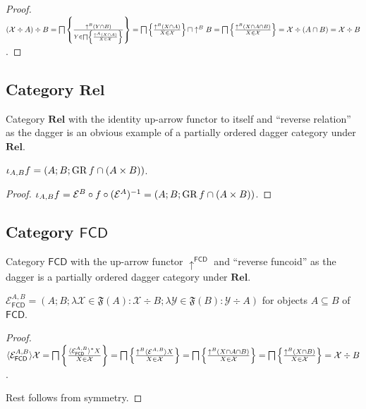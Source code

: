 \begin{proof}
  $(\mathcal{X} \div A) \div B = \bigsqcap \left\{ \frac{ \uparrow^B  (Y \cap B)
  }{ Y \in \bigsqcap \left\{ \frac{ \uparrow^A  (X \cap A)}{X \in \mathcal{X} }\right\} \mathcal{} }\right\} =
  \bigsqcap \left\{ \frac{ \uparrow^B  (X \cap A) }{ X \in
  \mathcal{X} }\right\} \sqcap \uparrow^B B = \bigsqcap \left\{ \frac{ \uparrow^B  (X
  \cap A \cap B) }{ X \in \mathcal{X} }\right\} =
  \mathcal{X} \div (A \cap B) = \mathcal{X} \div B$.
\end{proof}

\subsection{\texorpdfstring{Category $\mathbf{Rel}$}{Category Rel}}

Category $\mathbf{Rel}$ with the identity up-arrow functor to itself
and ``reverse relation'' as the dagger is an obvious example of a partially
ordered dagger category under $\mathbf{Rel}$.

\begin{prop}
  $\iota_{A, B} f = (A ; B ; \operatorname{GR} f \cap (A \times B))$.
\end{prop}

\begin{proof}
  $\iota_{A, B} f = \mathcal{E}^{B} \circ f \circ (\mathcal{E}^{A})^{-1} = (A ; B ; \operatorname{GR} f \cap (A \times B))$.
\end{proof}

\subsection{\texorpdfstring{Category $\mathsf{FCD}$}{Category FCD}}

Category $\mathsf{FCD}$ with the up-arrow functor
$\uparrow^{\mathsf{FCD}}$ and ``reverse funcoid'' as the dagger is a
partially ordered dagger category under $\mathbf{Rel}$.

\begin{prop}
  $\mathcal{E}_{\mathsf{FCD}}^{A,B} = (A ; B ; \lambda \mathcal{X}
  \in \mathfrak{F} (A) : \mathcal{X} \div B ; \lambda \mathcal{Y} \in
  \mathfrak{F} (B) : \mathcal{Y} \div A)$ for objects $A \subseteq B$ of
  $\mathsf{FCD}$.
\end{prop}

\begin{proof}
  $\langle \mathcal{E}_{\mathsf{FCD}}^{A,B} \rangle \mathcal{X} =
  \bigsqcap \left\{ \frac{ \langle \mathcal{E}_{\mathsf{FCD}}^{A,B}
  \rangle^{\ast} X }{ X \in \mathcal{X} }\right\} =
  \bigsqcap \left\{ \frac{ \uparrow^B  \langle \mathcal{E}^{A,B} \rangle X
  }{ X \in \mathcal{X} }\right\} = \bigsqcap \left\{ \frac{
  \uparrow^B  (X \cap A \cap B) }{ X \in \mathcal{X}
  }\right\} = \bigsqcap \left\{ \frac{ \uparrow^B  (X \cap B) }{
  X \in \mathcal{X} }\right\} = \mathcal{X} \div B$.
  
  Rest follows from symmetry.
\end{proof}

